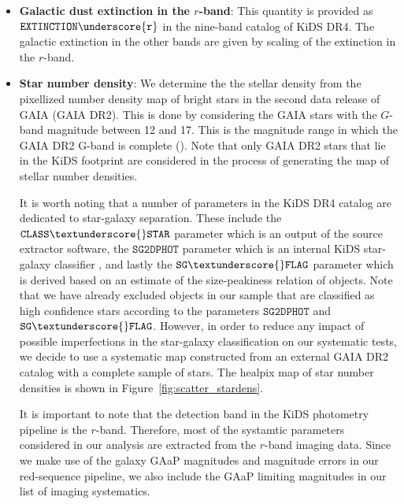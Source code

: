 \documentclass[fleqn,usenatbib,useAMS]{mnras}
\begin{document}
\begin{itemize}
  \item \textbf{Galactic dust extinction in the $r$-band}: This quantity is provided as $\mathtt{EXTINCTION\underscore{r}}$ in the nine-band catalog of KiDS DR4. The galactic extinction in the other bands are given by scaling of the extinction in the $r$-band.   
  
  \item \textbf{Star number density}: We determine the the stellar density from the pixellized number density map of bright stars in the second data release of GAIA (GAIA DR2). This is done by considering the GAIA stars with the $G$-band magnitude between 12 and 17. This is the magnitude range in which the GAIA DR2 G-band is complete (\citealt{gaia0,gaia1}). Note that only GAIA DR2 stars that lie in the KiDS footprint are considered in the process of generating the map of stellar number densities. 
  
  It is worth noting that a number of parameters in the KiDS DR4 catalog are dedicated to star-galaxy separation. These include the $\mathtt{CLASS\textunderscore{}STAR}$
  parameter which is an output of the source extractor software, the $\mathtt{SG2DPHOT}$ parameter which is an internal KiDS star-galaxy classifier \citep[e.g.][]{kids_dr3, radovich2017}, and lastly the $\mathtt{SG\textunderscore{}FLAG}$ parameter which is derived based on an estimate of the size-peakiness relation of objects. Note that we have already excluded objects in our sample that are classified as high confidence stars according to the parameters $\mathtt{SG2DPHOT}$ and $\mathtt{SG\textunderscore{} FLAG}$. However, in order to reduce any impact of possible imperfections in the star-galaxy classification on our systematic tests, we decide to use a systematic map constructed from an external GAIA DR2 catalog with a complete sample of stars. The healpix map of star number densities is shown in Figure~\ref{fig:scatter_stardens}.
 
  It is important to note that the detection band in the KiDS photometry pipeline is the $r$-band. Therefore, most of the systamtic parameters considered in our analysis are extracted from the $r$-band imaging data. Since we make use of the galaxy GAaP magnitudes and magnitude errors in our red-sequence pipeline, we also include the GAaP limiting magnitudes in our list of imaging systematics.  
 
\end{itemize}

\end{document}
